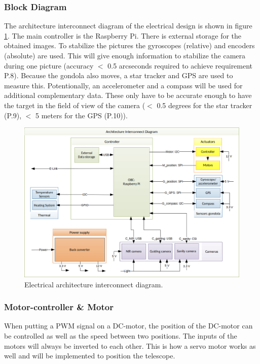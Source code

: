 \subsubsection{Block Diagram}
\label{sec:4.5.1}
The architecture interconnect diagram of the electrical design is shown in figure \ref{fig:elec-AID}. The main controller is the Raspberry Pi. There is external storage for the obtained images. To stabilize the pictures the gyroscopes (relative) and encoders (absolute) are used. This will give enough information to stabilize the camera during one picture (accuracy $<$ 0.5 arcseconds required to achieve requirement P.8). Because the gondola also moves, a star tracker and GPS are used to measure this. Potentionally, an accelerometer and a compass will be used for additional complementary data. These only have to be accurate enough to have the target in the field of view of the camera ($<$ 0.5 degrees for the star tracker (P.9), $<$ 5 meters for the GPS (P.10)).
\vspace{-.5cm}
\begin{figure}[H]
	\centering
	\includegraphics[width=.85\textwidth]{4-experiment-design/img/electrical/ArchitectureInterconnect.png}
	\caption{Electrical architecture interconnect diagram.}
	\label{fig:elec-AID}
\end{figure}

\subsubsection{Motor-controller \& Motor}
When putting a PWM signal on a DC-motor, the position of the DC-motor can be controlled as well as the speed between two positions. The inputs of the motors will always be inverted to each other. This is how a servo motor works as well and will be implemented to position the telescope.\\

